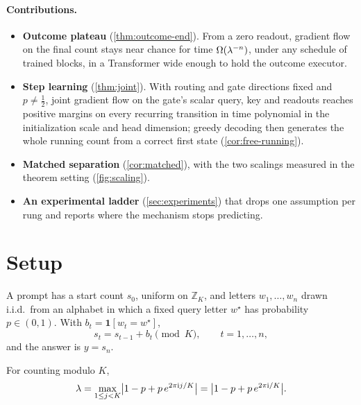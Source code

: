 \paragraph{Contributions.}
\begin{itemize}[leftmargin=*,itemsep=1pt,topsep=2pt]
\item \textbf{Outcome plateau} (\cref{thm:outcome-end}). From a zero readout, gradient flow on the final count stays near chance for time
$\Omega(\lambda^{-n})$, under any schedule of trained blocks, in a Transformer wide enough to hold the outcome executor.
\item \textbf{Step learning} (\cref{thm:joint}). With routing and gate directions fixed and $p\ne\tfrac12$, joint gradient flow on the gate's scalar query, key and readouts reaches
positive margins on every recurring transition in time polynomial in the initialization scale and head dimension; greedy decoding then
generates the whole running count from a correct first state (\cref{cor:free-running}).
\item \textbf{Matched separation} (\cref{cor:matched}), with the two scalings measured in the theorem setting (\cref{fig:scaling}).
\item \textbf{An experimental ladder} (\cref{sec:experiments}) that drops one assumption per rung and reports where the mechanism stops predicting.
\end{itemize}

\section{Setup}
\label{sec:setup}
\label{sec:setting}

\begin{definition}
\label{def:task}
A prompt has a start count $s_0$, uniform on $\mathbb Z_K$, and letters $w_1,\ldots,w_n$ drawn i.i.d.\ from an alphabet
in which a fixed query letter $w^\star$ has probability $p\in(0,1)$. With $b_t=\mathbf 1[w_t=w^\star]$,
\begin{equation}
 s_t=s_{t-1}+b_t\pmod K,\qquad t=1,\ldots,n,
 \label{eq:tracking}
\end{equation}
and the answer is $y=s_n$.
\end{definition}

\begin{definition}
\label{def:lambda}
For counting modulo $K$,
\begin{equation}
 \lambda=\max_{1\le j<K}\bigl|1-p+p\,e^{2\pi\mathrm ij/K}\bigr|=\bigl|1-p+p\,e^{2\pi\mathrm i/K}\bigr|.
 \label{eq:lambda}
\end{equation}
\end{definition}

